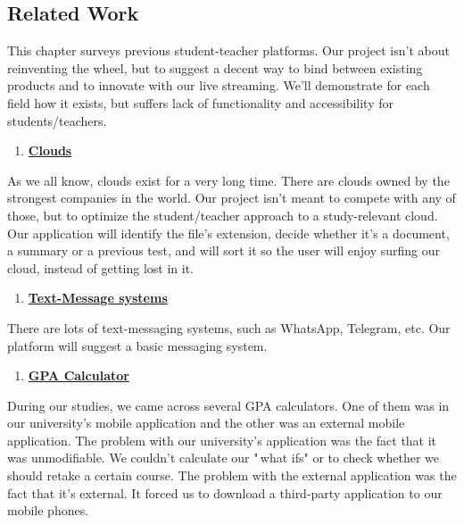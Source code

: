\documentclass[12pt,a4paper]{article}
\begin{document}
    \subsection{Related Work}


    This chapter surveys previous student-teacher platforms. Our project
    isn't about reinventing the wheel, but to suggest a decent way to bind
    between existing products and to innovate with our live streaming.
    We'll demonstrate for each field how it exists, but suffers lack of
    functionality and accessibility for students/teachers.

    \begin{enumerate}
        \item \textbf{\underline{Clouds}}
        \setcounter{numberedCntBD}{\theenumi}
    \end{enumerate}
    As we all know, clouds exist for a very long time. There are clouds
    owned by the strongest companies in the world. Our project isn't meant
    to compete with any of those, but to optimize the student/teacher
    approach to a study-relevant cloud. Our application will identify the
    file's extension, decide whether it's a document, a summary or a
    previous test, and will sort it so the user will enjoy surfing our
    cloud, instead of getting lost in it.



    \begin{enumerate}
        \setcounter{enumi}{\thenumberedCntBD}
        \item \textbf{\underline{Text-Message systems}}
        \setcounter{numberedCntBD}{\theenumi}
    \end{enumerate}
    There are lots of text-messaging systems, such as WhatsApp, Telegram,
    etc. Our platform will suggest a basic messaging system.





    \begin{enumerate}
        \setcounter{enumi}{\thenumberedCntBD}
        \item \textbf{\underline{GPA Calculator}}
        \setcounter{numberedCntBD}{\theenumi}
    \end{enumerate}
    During our studies, we came across several GPA calculators. One of them
    was in our university's mobile application and the other was an external
    mobile application. The problem with our university's application was
    the fact that it was unmodifiable. We couldn't calculate our "\,what
    ifs" or to check whether we should retake a certain course. The problem
    with the external application was the fact that it's external. It forced
    us to download a third-party application to our mobile phones.
\end{document}
